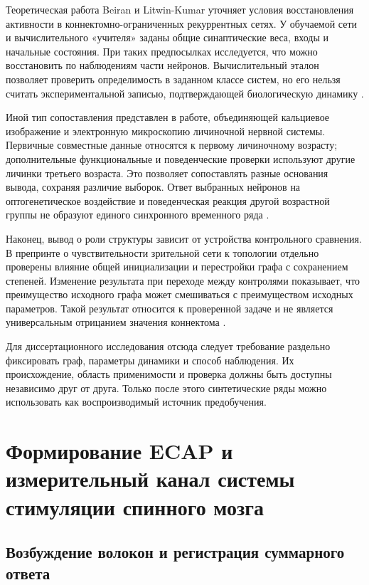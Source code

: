 Теоретическая работа Beiran и Litwin-Kumar уточняет условия восстановления активности в коннектомно-ограниченных рекуррентных сетях. У обучаемой сети и вычислительного «учителя» заданы общие синаптические веса, входы и начальные состояния. При таких предпосылках исследуется, что можно восстановить по наблюдениям части нейронов. Вычислительный эталон позволяет проверить определимость в заданном классе систем, но его нельзя считать экспериментальной записью, подтверждающей биологическую динамику \cite{s743}.

Иной тип сопоставления представлен в работе, объединяющей кальциевое изображение и электронную микроскопию личиночной нервной системы. Первичные совместные данные относятся к первому личиночному возрасту; дополнительные функциональные и поведенческие проверки используют другие личинки третьего возраста. Это позволяет сопоставлять разные основания вывода, сохраняя различие выборок. Ответ выбранных нейронов на оптогенетическое воздействие и поведенческая реакция другой возрастной группы не образуют единого синхронного временного ряда \cite{s212}.

Наконец, вывод о роли структуры зависит от устройства контрольного сравнения. В препринте о чувствительности зрительной сети к топологии отдельно проверены влияние общей инициализации и перестройки графа с сохранением степеней. Изменение результата при переходе между контролями показывает, что преимущество исходного графа может смешиваться с преимуществом исходных параметров. Такой результат относится к проверенной задаче и не является универсальным отрицанием значения коннектома \cite{s741}.

Для диссертационного исследования отсюда следует требование раздельно фиксировать граф, параметры динамики и способ наблюдения. Их происхождение, область применимости и проверка должны быть доступны независимо друг от друга. Только после этого синтетические ряды можно использовать как воспроизводимый источник предобучения.

\section{Формирование ECAP и измерительный канал системы стимуляции спинного мозга}
\label{sec:ecap-channel}

\subsection{Возбуждение волокон и регистрация суммарного ответа}

